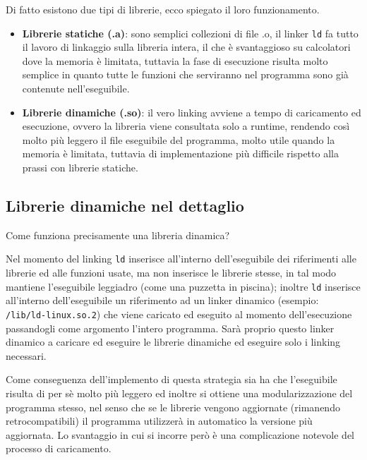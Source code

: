 \documentclass[class=book, crop=false, oneside]{standalone}
\begin{document}
Di fatto esistono due tipi di librerie, ecco spiegato il loro funzionamento.
\begin{itemize}
	\item \textbf{Librerie statiche (.a)}: sono semplici collezioni di file .o, il linker \texttt{ld} fa tutto il lavoro di linkaggio sulla libreria intera, il che è svantaggioso su calcolatori dove la memoria è limitata, tuttavia la fase di esecuzione risulta molto semplice in quanto tutte le funzioni che serviranno nel programma sono già contenute nell'eseguibile.
	\item \textbf{Librerie dinamiche (.so)}: il vero linking avviene a tempo di caricamento ed esecuzione, ovvero la libreria viene consultata solo a runtime, rendendo così molto più leggero il file eseguibile del programma, molto utile quando la memoria è limitata, tuttavia di implementazione più difficile rispetto alla prassi con librerie statiche.
\end{itemize}

\subsection{Librerie dinamiche nel dettaglio}

Come funziona precisamente una libreria dinamica?

Nel momento del linking \texttt{ld} inserisce all'interno dell'eseguibile dei riferimenti alle librerie ed alle funzioni usate, ma non inserisce le librerie stesse, in tal modo mantiene l'eseguibile leggiadro (come una puzzetta in piscina); inoltre \texttt{ld} inserisce all'interno dell'eseguibile un riferimento ad un linker dinamico (esempio: \texttt{/lib/ld-linux.so.2}) che viene caricato ed eseguito al momento dell'esecuzione passandogli come argomento l'intero programma.
Sarà proprio questo linker dinamico a caricare ed eseguire le librerie dinamiche ed eseguire solo i linking necessari.

Come conseguenza dell'implemento di questa strategia sia ha che l'eseguibile risulta di per sè molto più leggero ed inoltre si ottiene una modularizzazione del programma stesso, nel senso che se le librerie vengono aggiornate (rimanendo retrocompatibili) il programma utilizzerà in automatico la versione più aggiornata.
Lo svantaggio in cui si incorre però è una complicazione notevole del processo di caricamento.
\end{document}
